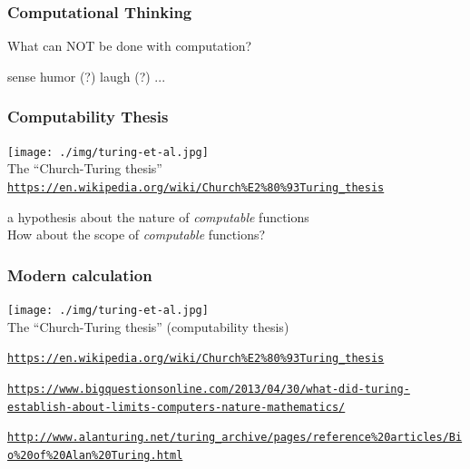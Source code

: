 \documentclass[11pt]{beamer}
\begin{document}
\begin{frame}
	\frametitle{Computational Thinking}
	\Enlarge
	\begin{itemize}
		\myitem What can NOT be done with computation? \pause
        \begin{itemize}
    		\mysubitem sense humor (?)\pause
            \mysubitem laugh (?)
            \mysubitem ...
        \end{itemize}
	\end{itemize}
	
\end{frame}


\begin{frame}[fragile]
  \frametitle{Computability Thesis}
  \centering
  \texttt{[image: ./img/turing-et-al.jpg]}\\
  The ``Church-Turing thesis''\\
  \textcolor{\CSBase}{\tiny \texttt{\url{https://en.wikipedia.org/wiki/Church\%E2\%80\%93Turing_thesis}}}
  \begin{center}
    a hypothesis about the nature of \emph{computable} functions \\ \vspace{2mm}\pause
    \textcolor{\CSGradBot}{How about the scope of \emph{computable} functions?}
  \end{center}
\end{frame}

\iffalse

\begin{frame}[fragile]
  \frametitle{Modern calculation}
 \centering
  \texttt{[image: ./img/turing-et-al.jpg]}\\
  The ``Church-Turing thesis'' (computability thesis)

   \begin{itemize}
   	\myitem \textcolor{\CSBase}{\tiny \texttt{\url{https://en.wikipedia.org/wiki/Church\%E2\%80\%93Turing_thesis}}}
   	
   	\myitem \textcolor{\CSBase}{\tiny \texttt{\url{https://www.bigquestionsonline.com/2013/04/30/what-did-turing-establish-about-limits-computers-nature-mathematics/}}}

    	\myitem \textcolor{\CSBase}{\tiny \texttt{\url{http://www.alanturing.net/turing_archive/pages/reference\%20articles/Bio\%20of\%20Alan\%20Turing.html}}}

   \end{itemize}
\end{frame}
\end{document}
